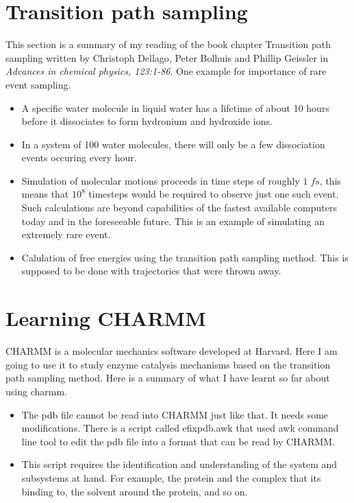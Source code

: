 \documentclass{article}
\begin{document}
\section{Transition path sampling}
This section is a summary of my reading of the book chapter Transition path sampling
written by Christoph Dellago, Peter Bolhuis and Phillip Geissler in \emph{Advances in chemical physics, 123:1-86}.
One example for importance of rare event sampling.
\begin{itemize}
\item A specific water molecule in liquid water has a lifetime of about 10 hours
before it dissociates to form hydronium and hydroxide ions.
\item In a system of 100 water molecules, there will only be a few dissociation events occuring every hour.
\item Simulation of molecular motions proceeds in time steps of roughly $1\;fs$, this means that 
$10^8$ timesteps would be required to observe just one such event. Such calculations are beyond capabilities of 
the fastest available computers today and in the foreseeable future. This is an example of 
simulating an extremely rare event. 
\end{itemize} 

\begin{itemize}
\item Calulation of free energies using the transition path sampling method. This is supposed to be done with 
trajectories that were thrown away. 
\end{itemize}

\section{Learning CHARMM}
CHARMM is a molecular mechanics software developed at Harvard. Here I am going to use it to 
study enzyme catalysis mechanisms based on the transition path sampling method. Here is a summary of what
I have learnt so far about using charmm.

\begin{itemize}
	\item The pdb file cannot be read into CHARMM just like that. It needs some modifications. There is a script 
	called efixpdb.awk that used awk command line tool to edit the pdb file into a format that can be 
	read by CHARMM. 
	\item This script requires the identification and understanding of the system and subsystems at hand. 
	For example, the protein and the complex that its binding to, the solvent around the protein, and so on.
\end{itemize}
\end{document}

